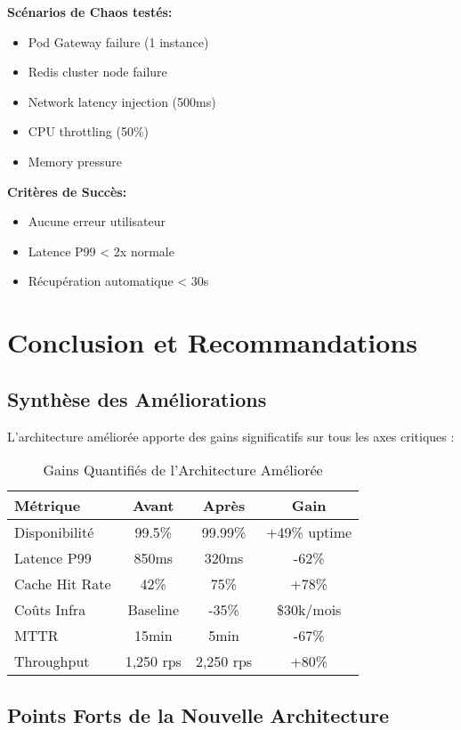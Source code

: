 \documentclass[12pt,a4paper]{article}
\begin{document}
\textbf{Scénarios de Chaos testés:}
\begin{itemize}[noitemsep]
    \item Pod Gateway failure (1 instance)
    \item Redis cluster node failure
    \item Network latency injection (500ms)
    \item CPU throttling (50\%)
    \item Memory pressure
\end{itemize}

\textbf{Critères de Succès:}
\begin{itemize}[noitemsep]
    \item Aucune erreur utilisateur
    \item Latence P99 < 2x normale
    \item Récupération automatique < 30s
\end{itemize}

\newpage
\section{Conclusion et Recommandations}

\subsection{Synthèse des Améliorations}

L'architecture améliorée apporte des gains significatifs sur tous les axes critiques :

\begin{table}[h]
\centering
\begin{tabular}{|l|c|c|c|}
\hline
\textbf{Métrique} & \textbf{Avant} & \textbf{Après} & \textbf{Gain} \\
\hline
Disponibilité & 99.5\% & 99.99\% & +49\% uptime \\
Latence P99 & 850ms & 320ms & -62\% \\
Cache Hit Rate & 42\% & 75\% & +78\% \\
Coûts Infra & Baseline & -35\% & \$30k/mois \\
MTTR & 15min & 5min & -67\% \\
Throughput & 1,250 rps & 2,250 rps & +80\% \\
\hline
\end{tabular}
\caption{Gains Quantifiés de l'Architecture Améliorée}
\end{table}

\subsection{Points Forts de la Nouvelle Architecture}
\end{document}

